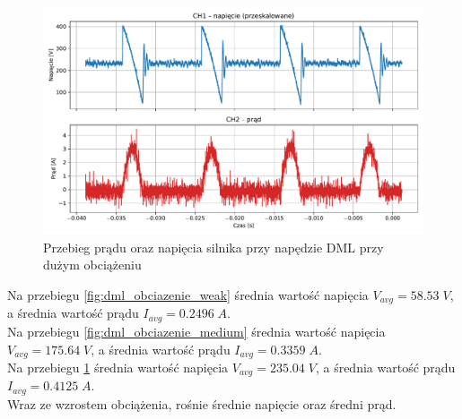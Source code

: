 \documentclass[11pt]{article}
\begin{document}
\begin{figure}[H]
    \centering
    \includegraphics[width=1\linewidth]{aun1_dml2_obciazenie_hard.pdf}
    \caption{Przebieg prądu oraz napięcia silnika przy napędzie DML przy dużym obciążeniu}
    \label{fig:dml_obciazenie_hard}
\end{figure}
Na przebiegu \ref{fig:dml_obciazenie_weak} średnia wartość napięcia \(V_{avg}=58.53\;V\), a średnia wartość prądu \(I_{avg}=0.2496\;A\).\\
Na przebiegu \ref{fig:dml_obciazenie_medium} średnia wartość napięcia \(V_{avg}=175.64\;V\), a średnia wartość prądu \(I_{avg}=0.3359\;A\).\\
Na przebiegu \ref{fig:dml_obciazenie_hard} średnia wartość napięcia \(V_{avg}=235.04\;V\), a średnia wartość prądu \(I_{avg}=0.4125\;A\).\\
Wraz ze wzrostem obciążenia, rośnie średnie napięcie oraz średni prąd.
\end{document}
